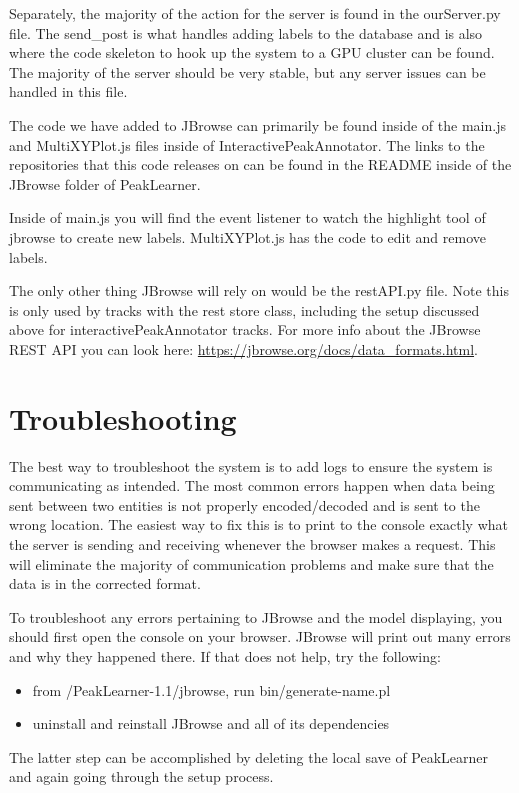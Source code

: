 \documentclass[a4paper,12pt]{article}
\newenvironment{monospace}{\fontfamily{pcr}\selectfont}{\par}
\begin{document}
Separately, the majority of the action for the server is found in the ourServer.py file. The send\_post is what handles adding labels to the database and is also where the code skeleton to hook up the system to a GPU cluster can be found. The majority of the server should be very stable, but any server issues can be handled in this file. \par

\newpage

The code we have added to JBrowse can primarily be found inside of the main.js and MultiXYPlot.js files inside of InteractivePeakAnnotator. The links to the repositories that this code releases on can be found in the README inside of the JBrowse folder of PeakLearner. \par

Inside of main.js you will find the event listener to watch the highlight tool of jbrowse to create new labels. MultiXYPlot.js has the code to edit and remove labels.  \par

The only other thing JBrowse will rely on would be the restAPI.py file. Note this is only used by tracks with the rest store class, including the setup discussed above for interactivePeakAnnotator tracks. For more info about the JBrowse REST API you can look here: \url{https://jbrowse.org/docs/data_formats.html}. 

\section{Troubleshooting}

The best way to troubleshoot the system is to add logs to ensure the system is communicating as intended. The most common errors happen when data being sent between two entities is not properly encoded/decoded and is sent to the wrong location. The easiest way to fix this is to print to the console exactly what the server is sending and receiving whenever the browser makes a request. This will eliminate the majority of communication problems and make sure that the data is in the corrected format.

To troubleshoot any errors pertaining to JBrowse and the model displaying, you should first open the console on your browser. JBrowse will print out many errors and why they happened there. If that does not help, try the following:
	\begin{itemize}
		\item from /PeakLearner-1.1/jbrowse, run \begin{monospace}bin/generate-name.pl\end{monospace}
		\item uninstall and reinstall JBrowse and all of its dependencies
	\end{itemize}
The latter step can be accomplished by deleting the local save of PeakLearner and again going through the setup process.
\end{document}
